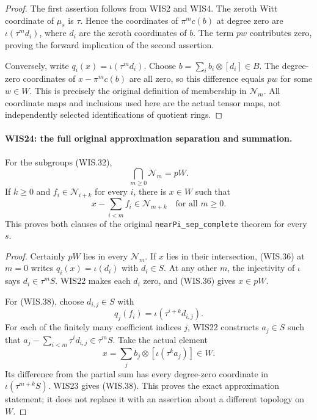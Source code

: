 \begin{proof}
The first assertion follows from WIS2 and WIS4.
The zeroth Witt coordinate of $\mu_s$ is $\tau$.
Hence the coordinates of $\pi^mc(b)$ at degree zero
are $\iota(\tau^m d_i)$, where $d_i$ are the zeroth
coordinates of $b$. The term $pw$ contributes zero,
proving the forward implication of the second assertion.

Conversely, write $q_i(x)=\iota(\tau^m d_i)$.
Choose $b=\sum_i b_i\otimes[d_i]\in B$.
The degree-zero coordinates of $x-\pi^mc(b)$
are all zero, so this difference equals $pw$
for some $w\in W$. This is precisely the original
definition of membership in $\mathcal N_m$.
All coordinate maps and inclusions used here are
the actual tensor maps, not independently selected
identifications of quotient rings.
\end{proof}

\paragraph{WIS24: the full original approximation separation and summation.}
\label{claim:WIS24}
For the subgroups (WIS.32),
\[
       \bigcap_{m\geq0}\mathcal N_m=pW.                    \tag{WIS.37}
\]
If $k\geq0$ and $f_i\in\mathcal N_{i+k}$ for every $i$,
there is $x\in W$ such that
\[
                      x-\sum_{i<m}f_i\in\mathcal N_{m+k}
                          \quad\text{for all }m\geq0.     \tag{WIS.38}
\]
This proves both clauses of the original
\texttt{nearPi\_sep\_complete} theorem for every $s$.

\begin{proof}
Certainly $pW$ lies in every $\mathcal N_m$.
If $x$ lies in their intersection, (WIS.36) at $m=0$
writes $q_i(x)=\iota(d_i)$ with $d_i\in S$.
At any other $m$, the injectivity of $\iota$ says
$d_i\in\tau^mS$. WIS22 makes each $d_i$ zero,
and (WIS.36) gives $x\in pW$.

For (WIS.38), choose $d_{i,j}\in S$ with
\[
                         q_j(f_i)=\iota(\tau^{i+k}d_{i,j}).
\]
For each of the finitely many coefficient indices $j$,
WIS22 constructs $a_j\in S$ such that
$a_j-\sum_{i<m}\tau^id_{i,j}\in\tau^mS$.
Take the actual element
\[
                      x=\sum_j b_j\otimes[\iota(\tau^k a_j)]
                               \in W.
 \tag{WIS.39}
\]
Its difference from the partial sum has every
degree-zero coordinate in $\iota(\tau^{m+k}S)$.
WIS23 gives (WIS.38). This proves the exact
approximation statement; it does not replace it
with an assertion about a different topology on $W$.
\end{proof}

